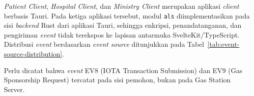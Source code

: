 \textit{Patient Client}, \textit{Hospital Client}, dan \textit{Ministry Client} merupakan aplikasi \textit{client} berbasis Tauri. Pada ketiga aplikasi tersebut, modul \texttt{als} diimplementasikan pada sisi \textit{backend} Rust dari aplikasi Tauri, sehingga enkripsi, penandatanganan, dan pengiriman \textit{event} tidak terekspos ke lapisan antarmuka SvelteKit/TypeScript. Distribusi \textit{event} berdasarkan \textit{event source} ditunjukkan pada Tabel~\ref{tab:event-source-distribution}.

Perlu dicatat bahwa \textit{event} EV8 (IOTA Transaction Submission) dan EV9 (Gas Sponsorship Request) tercatat pada sisi pemohon, bukan pada Gas Station
Server.